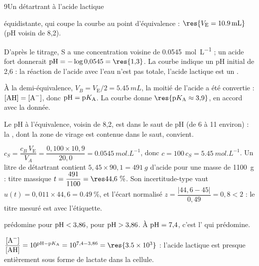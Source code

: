 \begin{corrigeBac}{9}{Un détartrant à l'acide lactique}
\begin{questions}[resume]
équidistante, qui coupe la courbe au point d'équivalence : $\res{V_\mathrm{E}=\qty{10,9}{mL}}$ (pH voisin de 8,2). \pts{1 pt}
\item D'après le titrage, S a une concentration voisine de \qty{0,0545}{mol.L^{-1}} ; un acide fort donnerait
$\pH=-\log0{,}0545=\res{1{,}3}$. La courbe indique un pH initial de 2,6 : la réaction de l'acide avec l'eau n'est pas totale,
l'acide lactique est un . 
\item À la demi-équivalence, $V_B=V_\mathrm{E}/2=\qty{5,45}{mL}$, la moitié de l'acide a été convertie : $[\ce{AH}]=[\ce{A-}]$, donc
$\mathrm{pH}=\mathrm{p}K_{\mathrm{A}}$. La courbe donne $\res{\pKa\approx3{,}9}$, en accord avec la donnée. 
\item Le pH à l'équivalence, voisin de 8,2, est dans le saut de pH (de 6 à 11 environ) : la , dont la
zone de virage est contenue dans le saut, convient. 
\item $c_S=\dfrac{c_B\,V_\mathrm{E}}{V_A}=\dfrac{0{,}100\times10{,}9}{20{,}0}=\qty{0,0545}{mol.L^{-1}}$, donc $c=100\,c_S=\qty{5,45}{mol.L^{-1}}$. Un litre de détartrant
contient $5{,}45\times90{,}1=\qty{491}{g}$ d'acide pour une masse de \qty{1100}{g} : titre massique $t=\dfrac{491}{1100}=\res{44{,}6~\%}$.
Son incertitude-type vaut $u(t)=0{,}011\times44{,}6=\qty{0,49}{\percent}$, et l'écart normalisé
$z=\dfrac{|44{,}6-45|}{0{,}49}=0{,}8<2$ : le titre mesuré est  avec l'étiquette. 
\end{questions}
\begin{questions}[resume]
\item {} prédomine pour $\mathrm{pH}<3{,}86$,  pour $\mathrm{pH}>3{,}86$. À $\mathrm{pH}=7{,}4$, c'est l' qui prédomine. 
\item $\dfrac{[\ce{A-}]}{[\ce{AH}]}=10^{\pH-\pKa}=10^{7{,}4-3{,}86}=\res{\num{3.5e3}}$ : l'acide lactique est presque entièrement sous forme de lactate
dans la cellule. 
\end{questions}
\end{corrigeBac}


